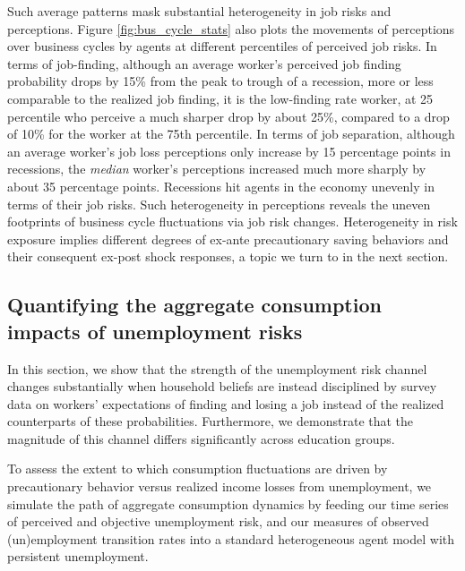 Such average patterns mask substantial heterogeneity in job risks and perceptions. Figure \ref{fig:bus_cycle_stats} also plots the movements of perceptions over business cycles by agents at different percentiles of perceived job risks. In terms of job-finding, although an average worker's perceived job finding probability drops by 15\% from the peak to trough of a recession, more or less comparable to the realized job finding, it is the low-finding rate worker, at 25 percentile who perceive a much sharper drop by about 25\%, compared to a drop of 10\% for the worker at the 75th percentile. In terms of job separation, although an average worker's job loss perceptions only increase by 15 percentage points in recessions, the \emph{median} worker's perceptions increased much more sharply by about 35 percentage points. Recessions hit agents in the economy unevenly in terms of their job risks. Such heterogeneity in perceptions reveals the uneven footprints of business cycle fluctuations via job risk changes. Heterogeneity in risk exposure implies different degrees of ex-ante precautionary saving behaviors and their consequent ex-post shock responses, a topic we turn to in the next section. 




\subsection{Quantifying the aggregate consumption impacts of unemployment risks}


In this section, we show that the strength of the unemployment risk channel changes substantially when household beliefs are instead disciplined by survey data on workers’ expectations of finding and losing a job instead of the realized counterparts of these probabilities. Furthermore, we demonstrate that the magnitude of this channel differs significantly across education groups.

To assess the extent to which consumption fluctuations are driven by precautionary behavior versus realized income losses from unemployment, we simulate the path of aggregate consumption dynamics by feeding our time series of perceived and objective unemployment risk, and our measures of observed (un)employment transition rates into a standard heterogeneous agent model with persistent unemployment.

